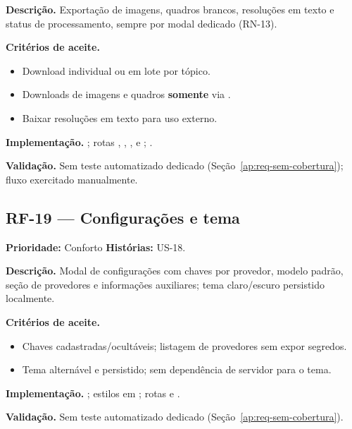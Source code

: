 \textbf{Descrição.} Exportação de imagens, quadros brancos, resoluções em texto e status de processamento, sempre por modal dedicado (RN-13).

\textbf{Critérios de aceite.}
\begin{itemize}
    \item Download individual ou em lote por tópico.
    \item Downloads de imagens e quadros \textbf{somente} via \texttt{}.
    \item Baixar resoluções em texto para uso externo.
\end{itemize}

\textbf{Implementação.} ; rotas \texttt{}, \texttt{}, \texttt{}, \texttt{} e \texttt{}; .

\textbf{Validação.} Sem teste automatizado dedicado (Seção~\ref{ap:req-sem-cobertura}); fluxo exercitado manualmente.

\subsection{RF-19 --- Configurações e tema}

\textbf{Prioridade:} Conforto \quad \textbf{Histórias:} US-18.

\textbf{Descrição.} Modal de configurações com chaves por provedor, modelo padrão, seção de provedores e informações auxiliares; tema claro/escuro persistido localmente.

\textbf{Critérios de aceite.}
\begin{itemize}
    \item Chaves cadastradas/ocultáveis; listagem de provedores sem expor segredos.
    \item Tema alternável e persistido; sem dependência de servidor para o tema.
\end{itemize}

\textbf{Implementação.} ; estilos \texttt{} em ; rotas \texttt{} e \texttt{}.

\textbf{Validação.} Sem teste automatizado dedicado (Seção~\ref{ap:req-sem-cobertura}).

